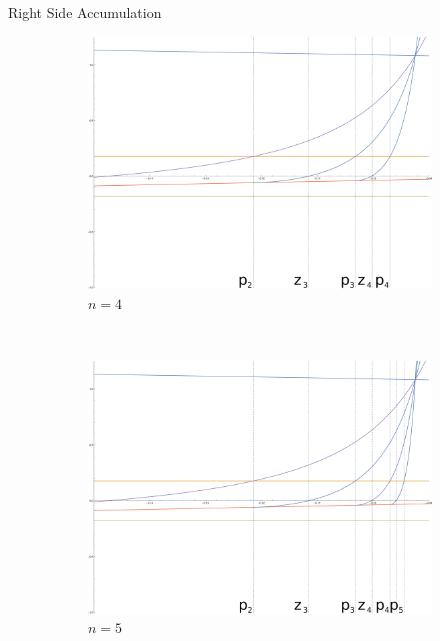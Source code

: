 \documentclass{beamer}
\newcommand{\<}{\left\langle}
\renewcommand{\>}{\right\rangle} %
\renewcommand{\*}{\cdot} %
\begin{document}
\begin{frame}[allowframebreaks]{Right Side Accumulation}
\begin{figure}[ht]
		\begin{subfigure}[b]{0.5\textwidth}
				\includegraphics[width=\textwidth]{./img/cplot3H}
				\caption{$n=4$}
				\label{fig:cplot3H}
		\end{subfigure}%
		~ %
		\begin{subfigure}[b]{0.5\textwidth}
				\includegraphics[width=\textwidth]{./img/cplot4H}
				\caption{$n=5$}
				\label{fig:cplot4H}
		\end{subfigure}
		\begin{subfigure}[b]{0.5\textwidth}

\end{subfigure}
\end{figure}
\end{frame}
\end{document}
